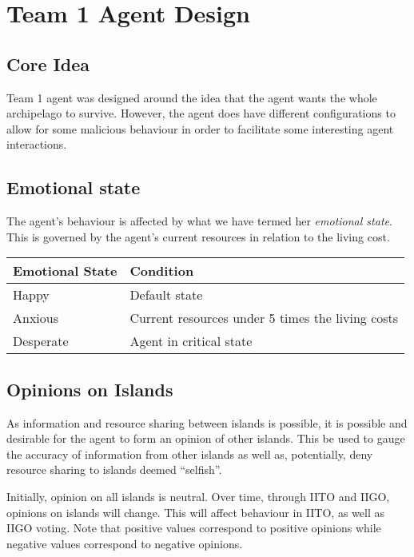 \chapter{Team 1 Agent Design}

\section{Core Idea}
Team 1 agent was designed around the idea that the agent wants the whole archipelago to survive. However, the agent does have different configurations to allow for some malicious behaviour in order to facilitate some interesting agent interactions.

\section{Emotional state}

The agent's behaviour is affected by what we have termed her \emph{emotional state}. This is governed by the agent's current resources in relation to the living cost.

\begin{table} [htb]
    \centering
    \begin{tabular}{|l|l|}
        \hline
        \textbf{Emotional State} & \textbf{Condition} \\
        \hline
        Happy & Default state \\
        \hline
        Anxious & Current resources under 5 times the living costs \\
        \hline
        Desperate & Agent in critical state \\
        \hline
    \end{tabular}
\end{table}


\section{Opinions on Islands}
As information and resource sharing between islands is possible, it is possible and desirable for the agent to form an opinion of other islands. This be used to gauge the accuracy of information from other islands as well as, potentially, deny resource sharing to islands deemed ``selfish''.

Initially, opinion on all islands is neutral. Over time, through IITO and IIGO, opinions on islands will change. This will affect behaviour in IITO, as well as IIGO voting. Note that positive values correspond to positive opinions while negative values correspond to negative opinions.

